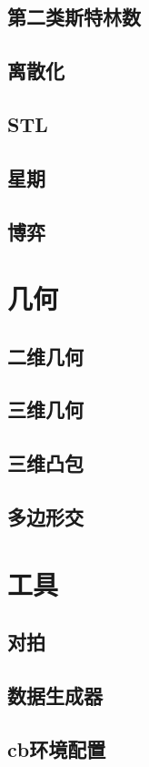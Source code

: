 \documentclass[10pt,a4paper]{article}
\begin{document}
\subsection{第二类斯特林数}

\subsection{离散化}

\subsection{STL}

\subsection{星期}

\subsection{博弈}

\section{几何}
\subsection{二维几何}

\subsection{三维几何}

\subsection{三维凸包}

\subsection{多边形交}

\section{工具}
\subsection{对拍}

\subsection{数据生成器}

\subsection{cb环境配置}

\end{document}
